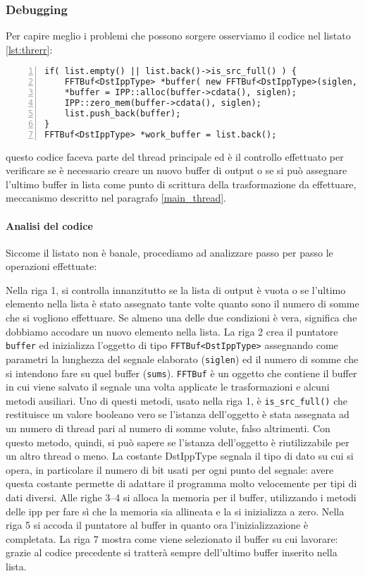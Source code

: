\subsubsection{Debugging}
Per capire meglio i problemi che possono sorgere osserviamo il codice nel
listato \ref{lst:threrr}:
\begin{lstlisting}[numbers=left,frame=l,float,caption=Codice problematico nel caso
	di pi\`u threads attivi,label=lst:threrr]
if( list.empty() || list.back()->is_src_full() ) {
	FFTBuf<DstIppType> *buffer( new FFTBuf<DstIppType>(siglen, sums) );
	*buffer = IPP::alloc(buffer->cdata(), siglen);
	IPP::zero_mem(buffer->cdata(), siglen);
	list.push_back(buffer);
}
FFTBuf<DstIppType> *work_buffer = list.back();
\end{lstlisting}
questo codice faceva parte del thread principale ed \`e il controllo effettuato
per verificare se \`e necessario creare un nuovo buffer di output o se si pu\`o
assegnare l'ultimo buffer in lista come punto di scrittura della trasformazione
da effettuare, meccanismo descritto nel paragrafo \ref{main_thread}.
\paragraph{Analisi del codice}
Siccome il listato non \`e banale, procediamo ad analizzare passo per passo le
operazioni effettuate:

Nella riga 1, si controlla innanzitutto se la lista di output \`e vuota o se
l'ultimo elemento nella lista \`e stato assegnato tante volte quanto sono il
numero di somme che si vogliono effettuare. Se almeno una delle due condizioni
\`e vera, significa che dobbiamo accodare un nuovo elemento nella lista. La riga
2 crea il puntatore \texttt{buffer} ed inizializza l'oggetto di tipo
\texttt{FFTBuf<DstIppType>} assegnando come parametri la lunghezza del segnale
elaborato (\texttt{siglen}) ed il numero di somme che si intendono fare su quel
buffer (\texttt{sums}). \texttt{FFTBuf} \`e un oggetto che contiene il buffer in
cui viene salvato il segnale una volta applicate le trasformazioni e alcuni
metodi ausiliari. Uno di questi metodi, usato nella riga 1, \`e
\texttt{is\_src\_full()} che restituisce un valore booleano vero se l'istanza
dell'oggetto \`e stata assegnata ad un numero di thread pari al numero di somme
volute, falso altrimenti. Con questo metodo, quindi, si pu\`o sapere se
l'istanza dell'oggetto \`e riutilizzabile per un altro thread o meno. La
costante DstIppType segnala il tipo di dato su cui si opera, in particolare il
numero di bit usati per ogni punto del segnale: avere questa costante permette
di adattare il programma molto velocemente per tipi di dati diversi. Alle righe
3--4 si alloca la memoria per il buffer, utilizzando i metodi delle \ac{ipp} per
fare s\`i che la memoria sia allineata e la si inizializza a zero.  Nella riga 5
si accoda il puntatore al buffer in quanto ora l'inizializzazione \`e
completata. La riga 7 mostra come viene selezionato il buffer su cui lavorare:
grazie al codice precedente si tratter\`a sempre dell'ultimo buffer inserito
nella lista.

